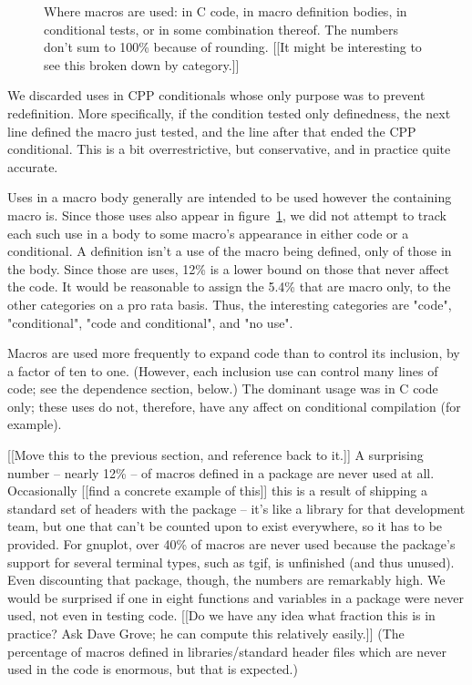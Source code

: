 \documentclass[10pt]{article}
\begin{document}
\begin{figure}
{\small
  \setlength{\tabcolsep}{.25em}
}
\caption{Where macros are used: in C code, in macro definition bodies, in
  conditional tests, or in some combination thereof.  The numbers don't sum to
  100\% because of rounding.  [[It might be interesting to see this
  broken down by category.]]}
\label{fig:where-used}
\end{figure}

      We discarded uses in CPP conditionals whose only purpose was to
        prevent redefinition.  More specifically, if the condition tested
        only definedness, the next line defined the macro just tested, and
        the line after that ended the CPP conditional.  This is a bit
        overrestrictive, but conservative, and in practice quite accurate.
        
        Uses in a macro body generally are intended to be used however the
        containing macro is.  Since those uses also appear in
        figure~\ref{fig:where-used}, we did not attempt to track each such
        use in a body to some macro's appearance in either code or a
        conditional.  
        A definition isn't a use of the macro being defined, only of those
        in the body.  Since those are uses, 12\% is a lower bound on those
        that never affect the code.
        It would be reasonable to assign the 5.4\% that are macro only, to
        the other categories on a pro rata basis.
        Thus, the interesting categories are "code",
        "conditional", "code and conditional", and "no use".

      Macros are used more frequently to expand code than to control its
        inclusion, by a factor of ten to one.  (However, each inclusion use
        can control many lines of code; see the dependence section, below.)
The dominant usage was in C code only; these uses
do not, therefore, have any affect on conditional compilation (for example).

[[Move this to the previous section, and reference back to it.]]
      A surprising number -- nearly 12\% -- of macros defined in a package
        are never used at all.  Occasionally [[find a concrete example of
        this]] this is a result of shipping a 
        standard set of headers with the package -- it's like a library for
        that development team, but one that can't be counted upon to exist
        everywhere, so it has to be provided.  For gnuplot, over 40\% of
        macros are never used because the package's support for several
        terminal types, such as tgif, is unfinished (and thus unused).
        Even discounting that package, though, the numbers are remarkably
        high.  We would be surprised if one in eight functions and
        variables in a package were never used, not even in testing code.
        [[Do we have any idea what fraction this is in practice?
        Ask Dave Grove; he can compute this relatively easily.]]
        (The percentage of macros defined in libraries/standard header
        files which are never used in the code is enormous, but that is
        expected.)
\end{document}
